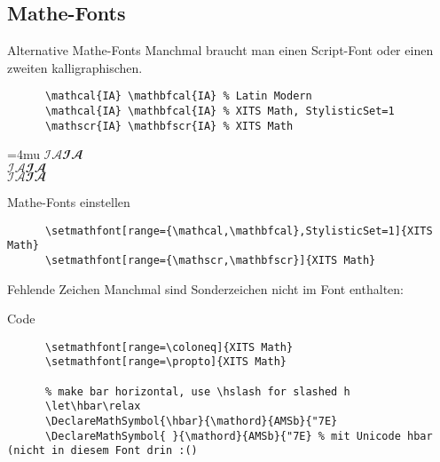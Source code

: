 \subsection{Mathe-Fonts}

\begin{frame}[fragile]{Alternative Mathe-Fonts}
  Manchmal braucht man einen Script-Font oder einen zweiten kalligraphischen.
  \vspace{1em}
  \begin{CodeExample}{0.83}
    \begin{lstlisting}
      \mathcal{IA} \mathbfcal{IA} % Latin Modern
      \mathcal{IA} \mathbfcal{IA} % XITS Math, StylisticSet=1
      \mathscr{IA} \mathbfscr{IA} % XITS Math
    \end{lstlisting}
  \CodeResult
    \Umathordordspacing\textstyle=4mu
    $\mathcal{I A} \mathbfcal{I A}$ \\
    { $\mathcal{I A} \mathbfcal{I A}$} \\
    $\mathscr{I A} \mathbfscr{I A}$
  \end{CodeExample}

  \begin{block}{Mathe-Fonts einstellen}
    \begin{lstlisting}
      \setmathfont[range={\mathcal,\mathbfcal},StylisticSet=1]{XITS Math}
      \setmathfont[range={\mathscr,\mathbfscr}]{XITS Math}
    \end{lstlisting}
  \end{block}
\end{frame}

\begin{frame}[fragile]{Fehlende Zeichen}
  Manchmal sind Sonderzeichen nicht im Font enthalten:
  \vspace{1em}
  \begin{block}{Code}
    \begin{lstlisting}
      \setmathfont[range=\coloneq]{XITS Math}
      \setmathfont[range=\propto]{XITS Math}

      % make bar horizontal, use \hslash for slashed h
      \let\hbar\relax
      \DeclareMathSymbol{\hbar}{\mathord}{AMSb}{"7E}
      \DeclareMathSymbol{ }{\mathord}{AMSb}{"7E} % mit Unicode hbar (nicht in diesem Font drin :()
    \end{lstlisting}
  \end{block}
\end{frame}
